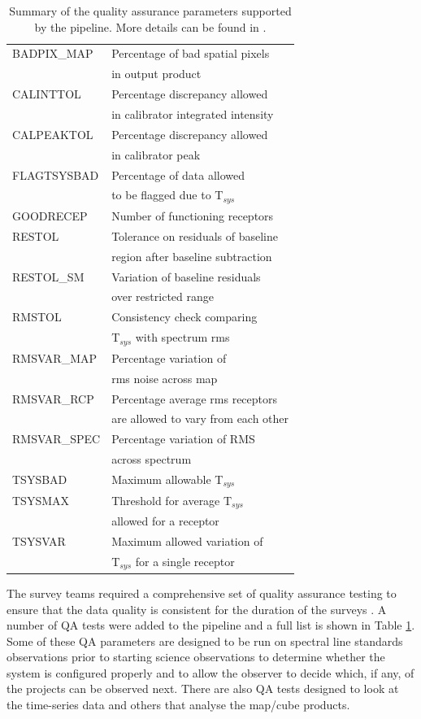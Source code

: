 \documentclass[final,authoryear,5p,times,twocolumn]{elsarticle}
\begin{document}
\begin{table}
  \caption{Summary of the quality assurance parameters supported by
    the pipeline. More details can be found in \citep{2008JCMTLSQA}.}
\label{tab:qa:params}
\begin{tabular}{ll}
BADPIX\_MAP  & Percentage of bad spatial pixels\\
   & in output product\\
CALINTTOL & Percentage discrepancy allowed\\
    &  in calibrator integrated intensity \\
CALPEAKTOL & Percentage discrepancy allowed\\
    & in calibrator peak\\
FLAGTSYSBAD & Percentage of data allowed \\
   & to be flagged due to T$_{sys}$\\
GOODRECEP & Number of functioning receptors\\
RESTOL & Tolerance on residuals of baseline \\
   & region after baseline subtraction\\
RESTOL\_SM & Variation of baseline residuals \\
  & over restricted range\\
RMSTOL & Consistency check comparing\\
  & T$_{sys}$ with spectrum rms\\
RMSVAR\_MAP & Percentage variation of\\
  & rms noise across map \\
RMSVAR\_RCP &  Percentage average rms receptors\\
  & are allowed to vary from each other\\
RMSVAR\_SPEC & Percentage variation of RMS\\
  & across spectrum \\
TSYSBAD &  Maximum allowable T$_{sys}$\\
TSYSMAX & Threshold for  average T$_{sys}$ \\
  & allowed for a receptor\\
TSYSVAR &  Maximum allowed variation of\\
  & T$_{sys}$ for a single receptor\\
\end{tabular}
\end{table}

The survey teams required a comprehensive set of quality assurance
testing to ensure that the data quality is consistent for the duration
of the surveys \citep{2008JCMTLSQA}. A number of QA tests were added
to the pipeline and a full list is shown in Table
\ref{tab:qa:params}. Some of these QA parameters are designed to be
run on spectral line standards observations prior to starting science
observations to determine whether the system is configured properly
and to allow the observer to decide which, if any, of the projects can
be observed next. There are also QA tests designed to look at the
time-series data and others that analyse the map/cube products.
\end{document}
